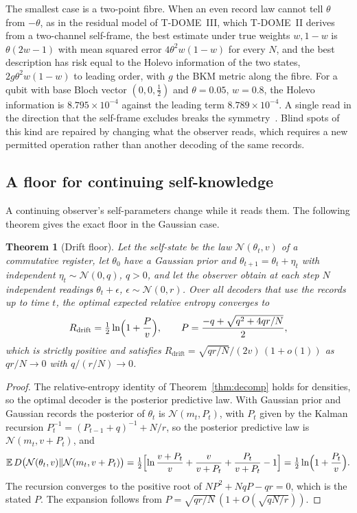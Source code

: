 \documentclass[12pt]{article}
\newtheorem{theorem}{Theorem}[section]
\theoremstyle{definition}
\theoremstyle{remark}
\newcommand{\E}{\mathbb E}
\begin{document}
The smallest case is a two-point fibre. When an even record law cannot tell $\theta$ from $-\theta$, as in the residual model of T-DOME~III, which T-DOME~II derives from a two-channel self-frame, the best estimate under true weights $w,1-w$ is $\theta(2w-1)$ with mean squared error $4\theta^2w(1-w)$ for every $N$, and the best description has risk equal to the Holevo information of the two states, $2g\theta^2w(1-w)$ to leading order, with $g$ the BKM metric along the fibre. For a qubit with base Bloch vector $(0,0,\tfrac12)$ and $\theta=0.05$, $w=0.8$, the Holevo information is $8.795\times10^{-4}$ against the leading term $8.789\times10^{-4}$. A single read in the direction that the self-frame excludes breaks the symmetry~\cite{TDOMEII}. Blind spots of this kind are repaired by changing what the observer reads, which requires a new permitted operation rather than another decoding of the same records.

\subsection{A floor for continuing self-knowledge}

A continuing observer's self-parameters change while it reads them. The following theorem gives the exact floor in the Gaussian case.

\begin{theorem}[Drift floor]\label{thm:drift}
Let the self-state be the law $\mathcal N(\theta_t,v)$ of a commutative register, let $\theta_0$ have a Gaussian prior and $\theta_{t+1}=\theta_t+\eta_t$ with independent $\eta_t\sim\mathcal N(0,q)$, $q>0$, and let the observer obtain at each step $N$ independent readings $\theta_t+\epsilon$, $\epsilon\sim\mathcal N(0,r)$. Over all decoders that use the records up to time $t$, the optimal expected relative entropy converges to
\begin{equation}\label{eq:driftfloor}
R_{\mathrm{drift}}=\tfrac12\ln\Bigl(1+\frac Pv\Bigr),\qquad P=\frac{-q+\sqrt{q^2+4qr/N}}{2},
\end{equation}
which is strictly positive and satisfies $R_{\mathrm{drift}}=\sqrt{qr/N}/(2v)\,(1+o(1))$ as $qr/N\to0$ with $q/(r/N)\to0$.
\end{theorem}

\begin{proof}
The relative-entropy identity of Theorem~\ref{thm:decomp} holds for densities, so the optimal decoder is the posterior predictive law. With Gaussian prior and Gaussian records the posterior of $\theta_t$ is $\mathcal N(m_t,P_t)$, with $P_t$ given by the Kalman recursion $P_{t}^{-1}=(P_{t-1}+q)^{-1}+N/r$, so the posterior predictive law is $\mathcal N(m_t,v+P_t)$, and
\[
\E\,D\bigl(\mathcal N(\theta_t,v)\Vert\mathcal N(m_t,v+P_t)\bigr)=\tfrac12\Bigl[\ln\frac{v+P_t}{v}+\frac{v}{v+P_t}+\frac{P_t}{v+P_t}-1\Bigr]=\tfrac12\ln\Bigl(1+\frac{P_t}v\Bigr).
\]
The recursion converges to the positive root of $NP^2+NqP-qr=0$, which is the stated $P$. The expansion follows from $P=\sqrt{qr/N}\,(1+O(\sqrt{qN/r}))$.
\end{proof}
\end{document}
